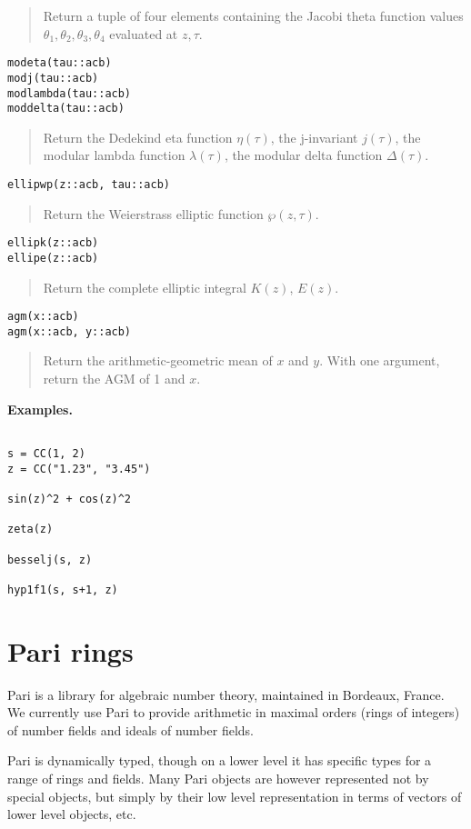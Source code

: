 \documentclass[a4paper,10pt]{article}
\newcommand{\desc}[1]{\vspace{-3mm}\begin{quote}#1\end{quote}}
\begin{document}
{{\desc{Return a tuple of four elements containing the Jacobi theta function
values $\theta_1, \theta_2, \theta_3, \theta_4$ evaluated at $z, \tau$.}

\begin{lstlisting}
modeta(tau::acb)
modj(tau::acb)
modlambda(tau::acb)
moddelta(tau::acb)
\end{lstlisting}

\desc{Return the Dedekind eta function $\eta(\tau)$, the j-invariant $j(\tau)$,
the modular lambda function $\lambda(\tau)$, the modular delta function $\Delta(\tau)$.}

\begin{lstlisting}
ellipwp(z::acb, tau::acb)
\end{lstlisting}

\desc{Return the Weierstrass elliptic function $\wp(z,\tau)$.}

\begin{lstlisting}
ellipk(z::acb)
ellipe(z::acb)
\end{lstlisting}

\desc{Return the complete elliptic integral $K(z)$, $E(z)$.}

\begin{lstlisting}
agm(x::acb)
agm(x::acb, y::acb)
\end{lstlisting}

\desc{Return the arithmetic-geometric mean of $x$ and $y$. With one argument,
return the AGM of 1 and $x$.}

\textbf{Examples.}

\begin{lstlisting}

s = CC(1, 2)
z = CC("1.23", "3.45")

sin(z)^2 + cos(z)^2

zeta(z)

besselj(s, z)

hyp1f1(s, s+1, z)

\end{lstlisting}

\section{Pari rings}

Pari is a library for algebraic number theory, maintained in Bordeaux, France.
We currently use Pari to provide arithmetic in maximal orders (rings of integers)
of number fields and ideals of number fields.

Pari is dynamically typed, though on a lower level it has specific types for a
range of rings and fields. Many Pari objects are however represented not by
special objects, but simply by their low level representation in terms of vectors
of lower level objects, etc.

}}
\end{document}
